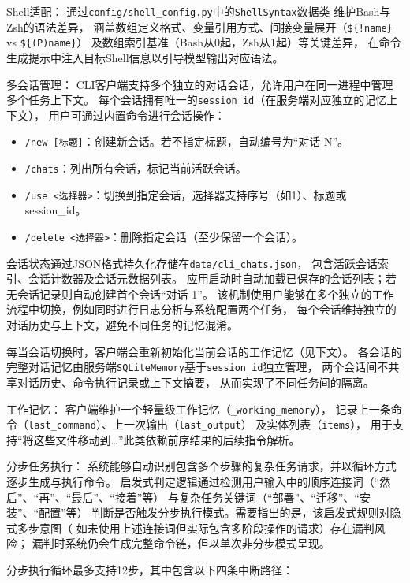 Shell适配：
通过\texttt{config/shell\_config.py}中的\texttt{ShellSyntax}数据类
维护Bash与Zsh的语法差异，
涵盖数组定义格式、变量引用方式、间接变量展开（\texttt{\$\{!name\}} vs \texttt{\$\{(P)name\}}）
及数组索引基准（Bash从0起，Zsh从1起）等关键差异，
在命令生成提示中注入目标Shell信息以引导模型输出对应语法。

多会话管理：
CLI客户端支持多个独立的对话会话，允许用户在同一进程中管理多个任务上下文。
每个会话拥有唯一的\texttt{session\_id}（在服务端对应独立的记忆上下文），
用户可通过内置命令进行会话操作：
\begin{itemize}
    \item \texttt{/new [标题]}：创建新会话。若不指定标题，自动编号为“对话 N”。
    \item \texttt{/chats}：列出所有会话，标记当前活跃会话。
    \item \texttt{/use <选择器>}：切换到指定会话，选择器支持序号（如1）、标题或session\_id。
    \item \texttt{/delete <选择器>}：删除指定会话（至少保留一个会话）。
\end{itemize}

会话状态通过JSON格式持久化存储在\texttt{data/cli\_chats.json}，
包含活跃会话索引、会话计数器及会话元数据列表。
应用启动时自动加载已保存的会话列表；若无会话记录则自动创建首个会话“对话 1”。
该机制使用户能够在多个独立的工作流程中切换，例如同时进行日志分析与系统配置两个任务，
每个会话维持独立的对话历史与上下文，避免不同任务的记忆混淆。

每当会话切换时，客户端会重新初始化当前会话的工作记忆（见下文）。
各会话的完整对话记忆由服务端\texttt{SQLiteMemory}基于\texttt{session\_id}独立管理，
两个会话间不共享对话历史、命令执行记录或上下文摘要，
从而实现了不同任务间的隔离。

工作记忆：
客户端维护一个轻量级工作记忆（\texttt{\_working\_memory}），
记录上一条命令（\texttt{last\_command}）、上一次输出（\texttt{last\_output}）
及实体列表（\texttt{items}），
用于支持“将这些文件移动到…”此类依赖前序结果的后续指令解析。

分步任务执行：
系统能够自动识别包含多个步骤的复杂任务请求，并以循环方式逐步生成与执行命令。
启发式判定逻辑通过检测用户输入中的顺序连接词（“然后”、“再”、“最后”、“接着”等）
与复杂任务关键词（“部署”、“迁移”、“安装”、“配置”等）
判断是否触发分步执行模式。需要指出的是，该启发式规则对隐式多步意图（
如未使用上述连接词但实际包含多阶段操作的请求）存在漏判风险；
漏判时系统仍会生成完整命令链，但以单次非分步模式呈现。

分步执行循环最多支持12步，其中包含以下四条中断路径：

